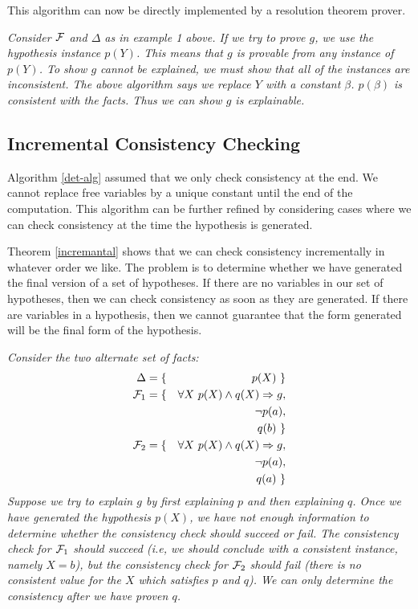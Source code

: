 This algorithm can now be directly implemented by a resolution theorem prover.

\begin{example}\em
Consider ${\cal F}$ and $\Delta$ as in example 1 above.
If we try to prove $g$, we use the hypothesis instance $p(Y)$.
This means that $g$ is provable from any instance of $p(Y)$.
To show $g$ cannot be explained, we must show that all of the instances
are inconsistent. The above algorithm says
we replace $Y$ with a constant $\beta$.
$p(\beta)$ is consistent with the facts.
Thus we can show $g$ is explainable.
\end{example}

\subsection{Incremental Consistency Checking} \label{incremental}
Algorithm \ref{det-alg} assumed that we only check consistency at the end.
We cannot replace free variables by a unique constant until the end
of the computation.
This algorithm can be further refined by considering cases
where we can check consistency at the time the hypothesis is generated.

Theorem \ref{incremantal} shows that we can check consistency incrementally
in whatever order we like. The problem is to determine whether we have
generated the final version of a set of hypotheses.
If there are no variables in our set of hypotheses, then we can check
consistency as soon as they are generated.
If there are variables in a hypothesis, then we cannot guarantee that the
form generated will be the final form of the hypothesis.
\begin{example}\em
Consider the two alternate set of facts:
\begin{eqnarray*}
\Delta&=\{&p(X)\ \}\\
{\cal F}_1&=\{&\forall X \ p(X) \wedge q(X) \Rightarrow g,\\
&&\neg p(a),\\
&&q(b) \ \}\\
{\cal F}_2&=\{&\forall X \ p(X) \wedge q(X) \Rightarrow g,\\
&&\neg p(a),\\
&&q(a) \ \}
\end{eqnarray*}
Suppose we try to explain $g$ by first explaining $p$ and then explaining $q$.
Once we have generated the hypothesis $p(X)$, we have not enough information to
determine whether the consistency check should succeed or fail.
The consistency check for ${\cal F}_1$ should succeed (i.e, we should conclude
with a consistent instance, namely $X=b$), but the 
consistency check for ${\cal F}_2$ should fail (there is no consistent value
for the $X$ which satisfies $p$ and $q$).
We can only determine the consistency after we have proven $q$.
\end{example}

